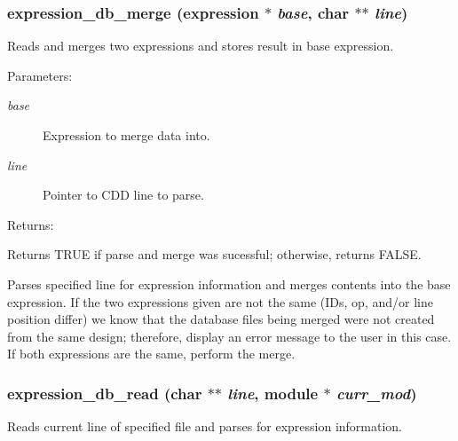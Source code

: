 \subsubsection{ expression\_\-db\_\-merge ({\bf expression} $\ast$ {\em base}, char $\ast$$\ast$ {\em line})}\label{expr_8h_a5}


Reads and merges two expressions and stores result in base expression.

\begin{Desc}
\item[Parameters: ]\par
\begin{description}
\item[{\em 
base}]Expression to merge data into. \item[{\em 
line}]Pointer to CDD line to parse.\end{description}
\end{Desc}
\begin{Desc}
\item[Returns: ]\par
Returns TRUE if parse and merge was sucessful; otherwise, returns FALSE.\end{Desc}
Parses specified line for expression information and merges contents into the base expression. If the two expressions given are not the same (IDs, op, and/or line position differ) we know that the database files being merged  were not created from the same design; therefore, display an error message  to the user in this case. If both expressions are the same, perform the  merge. 
\subsubsection{ expression\_\-db\_\-read (char $\ast$$\ast$ {\em line}, {\bf module} $\ast$ {\em curr\_\-mod})}\label{expr_8h_a4}


Reads current line of specified file and parses for expression information.

